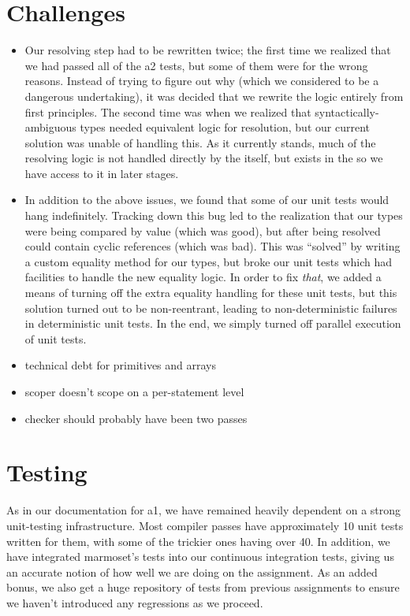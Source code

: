 \documentclass{article}
\begin{document}
\section{Challenges}
\begin{itemize}
    \item Our resolving step had to be rewritten twice; the first time we realized that we had passed all of the a2
        tests, but some of them were for the wrong reasons. Instead of trying to figure out why (which we considered to
        be a dangerous undertaking), it was decided that we rewrite the logic entirely from first principles. The second
        time was when we realized that syntactically-ambiguous types needed equivalent logic for resolution, but our
        current solution was unable of handling this. As it currently stands, much of the resolving logic is not handled
        directly by the  itself, but exists in the  so we have access to it in later
        stages.
    \item In addition to the above issues, we found that some of our  unit tests would hang indefinitely.
        Tracking down this bug led to the realization that our types were being compared by value (which was good), but
        after being resolved could contain cyclic references (which was bad). This was ``solved'' by writing a custom
        equality method for our types, but broke our unit tests which had facilities to handle the new equality logic.
        In order to fix \textit{that}, we added a means of turning off the extra equality handling for these unit tests,
        but this solution turned out to be non-reentrant, leading to non-deterministic failures in deterministic unit
        tests. In the end, we simply turned off parallel execution of unit tests.
    \item technical debt for primitives and arrays 
    \item scoper doesn't scope on a per-statement level 
    \item checker should probably have been two passes 
\end{itemize}




\section{Testing}

As in our documentation for a1, we have remained heavily dependent on a strong unit-testing infrastructure. Most
compiler passes have approximately 10 unit tests written for them, with some of the trickier ones having over 40. In
addition, we have integrated marmoset's tests into our continuous integration tests, giving us an accurate notion of how
well we are doing on the assignment. As an added bonus, we also get a huge repository of tests from previous assignments
to ensure we haven't introduced any regressions as we proceed.

\testsrc{*}
\end{document}
